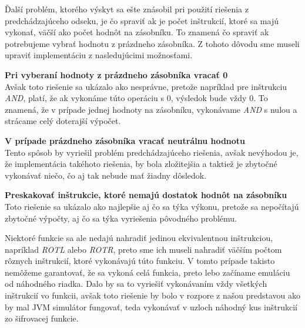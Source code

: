 Ďalší problém, ktorého výskyt sa ešte znásobil pri použití riešenia z predchádzajúceho odseku, je čo spraviť ak je počet inštrukcií, ktoré sa majú vykonať, väčší ako počet hodnôt na zásobníku. To znamená čo spraviť ak potrebujeme vybrať hodnotu z prázdneho zásobníka. Z tohoto dôvodu sme museli upraviť implementáciu z nasledujúcimi možnosťami.

\begin{myItemize}
 \item \textbf{Pri vyberaní hodnoty z prázdneho zásobníka vracať 0}\\Avšak toto riešenie sa ukázalo ako nesprávne, pretože napríklad pre inštrukciu \textit{AND}, platí, že ak vykonáme túto operáciu s 0, výsledok bude vždy 0. To znamená, že v prípade jednej hodnoty na zásobníku, vykonávame \textit{AND} s nulou a strácame celý doterajší výpočet.
 \item \textbf{V prípade prázdneho zásobníka vracať neutrálnu hodnotu}\\Tento spôsob by vyriešil problém predchádzajúceho riešenia, avšak nevýhodou je, že implementácia takéhoto riešenia, by bola zložitejšia a taktiež je zbytočné vykonávať niečo, čo aj tak nebude mať žiadny dôsledok. 
 \item \textbf{Preskakovať inštrukcie, ktoré nemajú dostatok hodnôt na zásobníku}\\Toto riešenie sa ukázalo ako najlepšie aj čo sa týka výkonu, pretože sa nepočítajú zbytočné výpočty, aj čo sa týka vyriešenia pôvodného problému.  
\end{myItemize}

Niektoré funkcie sa ale nedajú nahradiť jedinou ekvivalentnou inštrukciou, napríklad \textit{ROTL} alebo \textit{ROTR}, preto sme ich museli nahradiť väčším počtom rôznych inštrukcií, ktoré vykonávajú túto funkciu. V tomto prípade takisto nemôžeme garantovať, že sa vykoná celá funkcia, preto lebo začíname emuláciu od náhodného riadka. Dalo by sa to vyriešiť vykonávaním vždy všetkých inštrukcií vo funkcii, avšak toto riešenie by bolo v rozpore z našou predstavou ako by mal JVM simulátor fungovať, teda vykonávať v uzloch náhodný kus inštrukcií zo šifrovacej funkcie. 

 
 